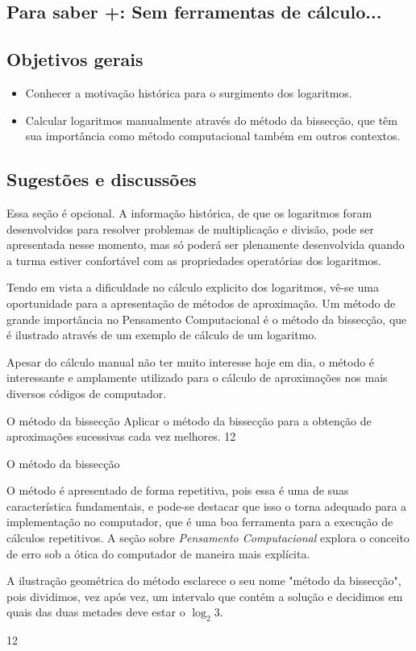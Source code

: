 \clearpage
\def\currentcolor{session3}
\begin{texto}
{	\section{Para saber +: Sem ferramentas de cálculo...}
	
	\subsection{Objetivos gerais}
	\begin{itemize}
	\item Conhecer a motivação histórica para o surgimento dos logaritmos.
	\item Calcular logaritmos manualmente através do método da bissecção, que têm sua importância como método computacional também em outros contextos.
	\end{itemize}

	\subsection{Sugestões e discussões}
	Essa seção é opcional. A informação histórica, de que os logaritmos foram desenvolvidos para resolver problemas de multiplicação e divisão, pode ser apresentada nesse momento, mas só poderá ser plenamente desenvolvida quando a turma estiver confortável com as propriedades operatórias dos logaritmos.

	Tendo em vista a dificuldade no cálculo explicito dos logaritmos, vê-se uma oportunidade para a apresentação de métodos de aproximação. Um método de grande importância no Pensamento Computacional é o método da bissecção, que é ilustrado através de um exemplo de cálculo de um logaritmo.

	Apesar do cálculo manual não ter muito interesse hoje em dia, o método é interessante e amplamente utilizado para o cálculo de aproximações nos mais diversos códigos de computador.
}
\end{texto}

\begin{objectives}{O método da bissecção}
{
	Aplicar o método da bissecção para a obtenção de aproximações sucessivas cada vez melhores.
}{1}{2}
\end{objectives}
\begin{sugestions}{O método da bissecção}
{
	O método é apresentado de forma repetitiva, pois essa é uma de suas característica fundamentais, e pode-se destacar que isso o torna adequado para a implementação no computador, que é uma boa ferramenta para a execução de cálculos repetitivos. A seção sobre \textit{Pensamento Computacional} explora o conceito de erro sob a ótica do computador de maneira mais explícita.

	A ilustração geométrica do método esclarece o seu nome "método da bissecção", pois dividimos, vez após vez, um intervalo que contém a solução e decidimos em quais das duas metades deve estar o $\log_2 3$. 
}{1}{2}
\end{sugestions}

